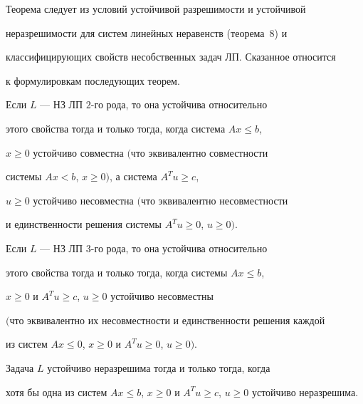 Теорема следует из условий устойчивой разрешимости и устойчивой


неразрешимости для систем линейных неравенств (теорема~8) и


классифицирующих свойств несобственных задач ЛП. Сказанное относится


к формулировкам последующих теорем.





\begin{thm}


Если $L$ --- НЗ ЛП\; $2$-го рода, то она устойчива относительно


этого свойства тогда и только тогда, когда система $Ax\leq b$,


$x\geq 0$ устойчиво совместна $($что эквивалентно совместности


системы $Ax<b$, $x\geq 0)$, а система $A^Tu\geq c$,


$u\geq 0$ устойчиво несовместна $($что эквивалентно несовместности


и единственности решения системы $A^Tu\geq 0$, $u\geq 0)$.


\end{thm}





\begin{thm}


Если $L$ --- НЗ ЛП\; $3$-го рода, то она устойчива относительно


этого свойства тогда и только тогда, когда системы $Ax\leq b$,


$x\geq 0$ и $A^Tu\geq c$, $u\geq 0$ устойчиво несовместны


$($что эквивалентно их несовместности и единственности решения каждой


из систем $Ax\leq 0$, $x\geq 0$ и $A^Tu\geq 0$, $u\geq 0)$.


\end{thm}





\begin{thm}


Задача $L$ устойчиво неразрешима тогда и только тогда, когда


хотя бы одна из систем $Ax\leq b$, $x\geq 0$ и $A^Tu\geq


c$, $u\geq 0$ устойчиво неразрешима.


\end{thm}





